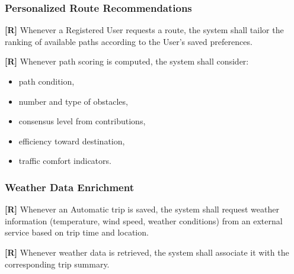 
\subsubsection*{Personalized Route Recommendations}

\textbf{[R\creq]} Whenever a Registered User requests a route, the system shall tailor the ranking of available paths according to the User’s saved preferences.

\textbf{[R\creq]} Whenever path scoring is computed, the system shall consider:
\begin{itemize}
    \item path condition,
    \item number and type of obstacles,
    \item consensus level from contributions,
    \item efficiency toward destination,
    \item traffic comfort indicators.
\end{itemize}







\subsubsection*{Weather Data Enrichment}

\textbf{[R\creq]} Whenever an Automatic trip is saved, the system shall request weather information (temperature, wind speed, weather conditions) from an external service based on trip time and location.

\textbf{[R\creq]} Whenever weather data is retrieved, the system shall associate it with the corresponding trip summary.


